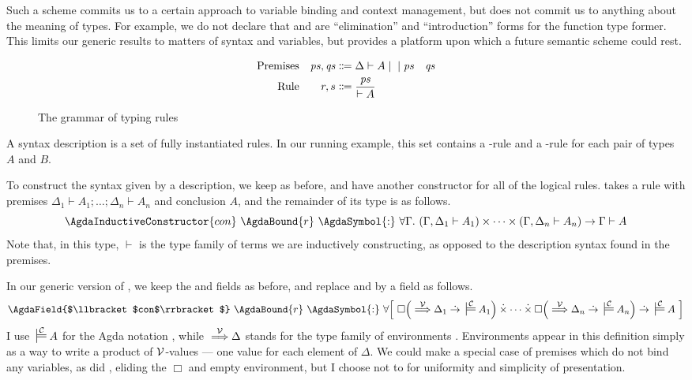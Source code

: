 Such a scheme commits us to a certain approach to variable binding and context
management, but does not commit us to anything about the meaning of types.
For example, we do not declare that  and  are
``elimination'' and ``introduction'' forms for the function type former.
This limits our generic results to matters of syntax and variables, but provides
a platform upon which a future semantic scheme could rest.

\begin{figure}
  \begin{align*}
    \text{Premises} && \mathit{ps}, \mathit{qs} &\Coloneqq
      \Delta \vdash A \mid {} \mid \mathit{ps} \quad \mathit{qs}
    \\
    \text{Rule} && r, s &\Coloneqq {\mathit{ps} \over \vdash A}
  \end{align*}
  \caption{The grammar of typing rules}
  \label{fig:simple-syntax}
\end{figure}

A syntax description is a set of fully instantiated rules.
In our running example, this set contains a -rule and a
-rule for each pair of types $A$ and $B$.

To construct the syntax given by a description, we keep
 as before, and have another constructor
 for all of the logical rules.
 takes a rule  with premises
$\Delta_1 \vdash A_1; \ldots; \Delta_n \vdash A_n$ and conclusion $A$, and the
remainder of its type is as follows.
\[
  \AgdaInductiveConstructor{con}~\AgdaBound{r}~\AgdaSymbol{:}~%
  \forall\Gamma.~(\Gamma, \Delta_1 \vdash A_1) \times \cdots
  \times (\Gamma, \Delta_n \vdash A_n) \to \Gamma \vdash A
\]
Note that, in this type, $\vdash$ is the type family of terms we are
inductively constructing, as opposed to the description syntax found in the
premises.

In our generic version of , we keep the
 and 
fields as before, and replace  and
 by a
 field as follows.
\[
  \AgdaField{$\llbracket$con$\rrbracket$}~\AgdaBound{r}~\AgdaSymbol{:}~%
  \forallb{%
    \Box\plr{{} \env\V \Delta_1 \dotto {} \sdtstile{}\C A_1} \dottimes
    \cdots \dottimes
    \Box\plr{{} \env\V \Delta_n \dotto {} \sdtstile{}\C A_n} \dotto
    {} \sdtstile{}\C A}
\]
I use ${} \sdtstile{}\C A$ for the Agda notation
\AgdaFunction{\_$\C\vDash$}\AgdaSpace{}, while ${} \stackrel{\mathcal V}\Longrightarrow \Delta$
stands for the type family of environments
\AgdaSymbol{$\lambda$}\AgdaSpace{}\AgdaBound{$\Gamma$}\AgdaSpace{}%
\AgdaSymbol{$\to$}\AgdaSpace{}\AgdaSpace{}\AgdaBound{$\V$}%
\AgdaSpace{}\AgdaBound{$\Gamma$}\AgdaSpace{}\AgdaBound{$\Delta$}.
Environments appear in this definition simply as a way to write a product of
$\V$-values --- one value for each element of $\Delta$.
We could make a special case of premises which do not bind any variables, as did
\citet{AACMM21}, eliding the $\Box$ and empty environment, but I choose not to
for uniformity and simplicity of presentation.
